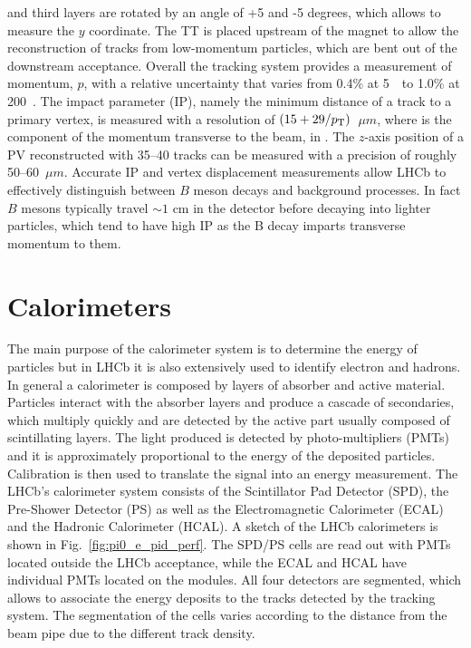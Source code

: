 and third layers are rotated by an angle of +5 and -5 degrees, which allows to measure the $y$ coordinate. 
The TT is placed upstream of the magnet to allow the reconstruction of tracks from low-momentum particles,
which are bent out of the downstream acceptance. Overall the tracking system provides a measurement of momentum, 
$p$,  with a relative uncertainty that varies from 0.4\% at 5~\gevc~to 1.0\% at 200~\gevc. 
The impact parameter (IP), namely the minimum distance of a track to a primary vertex, is measured 
with a resolution of $(15 + 29/\mbox{$p_{\rm T}$})$~$\mu m$, where \pt is the component of the momentum transverse to the 
beam, in \gevc. The $z$-axis position of a PV reconstructed with 35--40 tracks can be measured with a precision 
of roughly 50--60~$\mu m$. Accurate IP and vertex displacement measurements allow LHCb to effectively distinguish 
between $B$ meson decays and background processes. In fact $B$ mesons typically travel $\sim 1$ cm in
the detector before decaying into lighter particles, which tend to have high IP as the B decay imparts
transverse momentum to them.


\section{Calorimeters}
\label{sec:calorimeters}

The main purpose of the calorimeter system is to determine the energy of particles
but in LHCb it is also extensively used to identify electron and hadrons. 
In general a calorimeter is composed by layers of absorber and active material. Particles interact with the absorber
layers and produce a cascade of secondaries, which multiply quickly and are detected by the active part
usually composed of scintillating layers. The light produced is detected by photo-multipliers (PMTs) and it is approximately
proportional to the energy of the deposited particles. Calibration is then used to translate the signal into an
energy measurement. 
The LHCb's calorimeter system consists of the Scintillator Pad Detector (SPD), the Pre-Shower Detector (PS)
as well as the Electromagnetic Calorimeter (ECAL) and the Hadronic Calorimeter (HCAL).
A sketch of the LHCb calorimeters is shown in Fig.~\ref{fig:pi0_e_pid_perf}. 
The SPD/PS cells are read out with PMTs 
located outside the LHCb acceptance, while the ECAL and HCAL have individual PMTs
located on the modules. All four detectors are segmented, which allows to associate the energy
deposits to the tracks detected by the tracking system. The segmentation of the cells varies according 
to the distance from the beam pipe due to the different track density.

